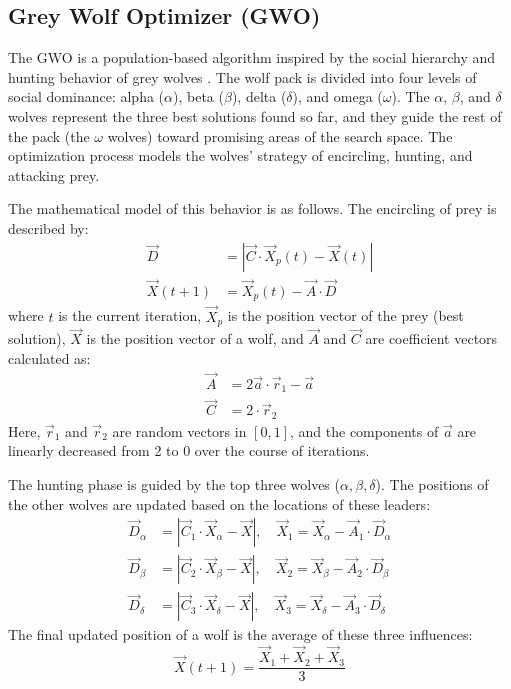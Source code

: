 \subsection{Grey Wolf Optimizer (GWO)}
The GWO is a population-based algorithm inspired by the social hierarchy and hunting behavior of grey wolves  \cite{gwo}. The wolf pack is divided into four levels of social dominance: alpha ($\alpha$), beta ($\beta$), delta ($\delta$), and omega ($\omega$). The $\alpha$, $\beta$, and $\delta$ wolves represent the three best solutions found so far, and they guide the rest of the pack (the $\omega$ wolves) toward promising areas of the search space. The optimization process models the wolves' strategy of encircling, hunting, and attacking prey.

The mathematical model of this behavior is as follows. The encircling of prey is described by: 
\begin{align}
    \vec{D} &= |\vec{C} \cdot \vec{X}_p(t) - \vec{X}(t)| \\
    \vec{X}(t+1) &= \vec{X}_p(t) - \vec{A} \cdot \vec{D}
\end{align}
where $t$ is the current iteration, $\vec{X}_p$ is the position vector of the prey (best solution), $\vec{X}$ is the position vector of a wolf, and $\vec{A}$ and $\vec{C}$ are coefficient vectors calculated as:
\begin{align}
    \vec{A} &= 2\vec{a} \cdot \vec{r}_1 - \vec{a} \\
    \vec{C} &= 2 \cdot \vec{r}_2
\end{align}
Here, $\vec{r}_1$ and $\vec{r}_2$ are random vectors in $[0, 1]$, and the components of $\vec{a}$ are linearly decreased from 2 to 0 over the course of iterations.

The hunting phase is guided by the top three wolves ($\alpha, \beta, \delta$). The positions of the other wolves are updated based on the locations of these leaders:
\begin{align}
    \vec{D}_\alpha &= |\vec{C}_1 \cdot \vec{X}_\alpha - \vec{X}|, \quad \vec{X}_1 = \vec{X}_\alpha - \vec{A}_1 \cdot \vec{D}_\alpha \\
    \vec{D}_\beta &= |\vec{C}_2 \cdot \vec{X}_\beta - \vec{X}|, \quad \vec{X}_2 = \vec{X}_\beta - \vec{A}_2 \cdot \vec{D}_\beta \\
    \vec{D}_\delta &= |\vec{C}_3 \cdot \vec{X}_\delta - \vec{X}|, \quad \vec{X}_3 = \vec{X}_\delta - \vec{A}_3 \cdot \vec{D}_\delta
\end{align}
The final updated position of a wolf is the average of these three influences:
\begin{equation}
    \vec{X}(t+1) = \frac{\vec{X}_1 + \vec{X}_2 + \vec{X}_3}{3}
\end{equation}

